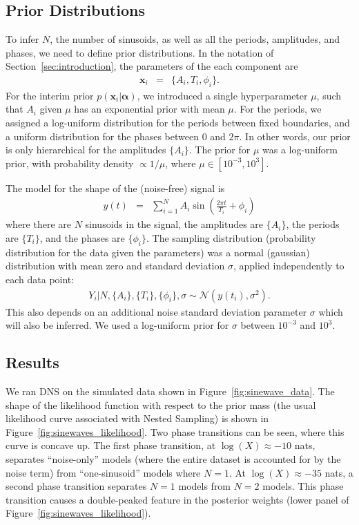 \documentclass[letterpaper, 11pt]{article}
\newcommand{\hyperparams}{\boldsymbol{\alpha}}
\newcommand{\xx}{\mathbf{x}}
\begin{document}
\subsection{Prior Distributions}
To infer $N$, the number of sinusoids, as well as all the periods, amplitudes,
and phases, we need to define prior distributions.
In the notation of Section~\ref{sec:introduction}, the parameters of the
each component are
\begin{eqnarray}
\xx_i &=& \{A_i, T_i, \phi_i\}.
\end{eqnarray}
For the interim prior $p(\xx_i | \hyperparams)$, we introduced a single
hyperparameter $\mu$, such that $A_i$ given $\mu$ has an exponential prior
with mean $\mu$. For the periods, we assigned a log-uniform distribution for
the periods between fixed boundaries, and a uniform distribution for the phases
between 0 and $2\pi$. In other words, our prior is only hierarchical for the
amplitudes $\{A_i\}$. The prior for $\mu$ was a log-uniform prior, with
probability density $\propto 1/\mu$, where $\mu \in [10^{-3}, 10^3]$.

The model for the shape of the (noise-free) signal is
\begin{eqnarray}
y(t) &=& \sum_{i=1}^N A_i \sin \left(\frac{2\pi t}{T_i} + \phi_i\right)
\end{eqnarray}
where there are $N$ sinusoids in the signal, the
amplitudes are $\{A_i\}$, the periods are $\{T_i\}$, and the phases are
$\{\phi_i\}$.
The sampling distribution (probability distribution for the data given the
parameters) was a normal (gaussian) distribution with mean zero and standard
deviation $\sigma$, applied independently to each data point:
\begin{eqnarray}
Y_i | N, \{A_i\}, \{T_i\}, \{\phi_i\}, \sigma \sim
\mathcal{N}\left(y(t_i), \sigma^2\right).
\end{eqnarray}
This also depends on an additional noise standard deviation parameter $\sigma$
which will also be inferred. We used a log-uniform prior for $\sigma$ between
$10^{-3}$ and $10^{3}$.

\subsection{Results}
We ran DNS on the simulated data shown in Figure~\ref{fig:sinewave_data}.
The shape of the likelihood function with respect to the prior mass (the
usual likelihood curve associated with Nested Sampling) is shown in
Figure~\ref{fig:sinewaves_likelihood}. Two phase transitions can be seen,
where this curve is concave up. The
first phase transition, at $\log(X) \approx -10$ nats,
separates ``noise-only'' models (where the
entire dataset is accounted for by the noise term) from ``one-sinusoid'' models
where $N=1$. At $\log(X) \approx -35$ nats, a second phase transition separates
$N=1$ models from $N=2$ models. This phase transition causes a double-peaked
feature in the posterior weights (lower panel of
Figure~\ref{fig:sinewaves_likelihood}).
\end{document}
